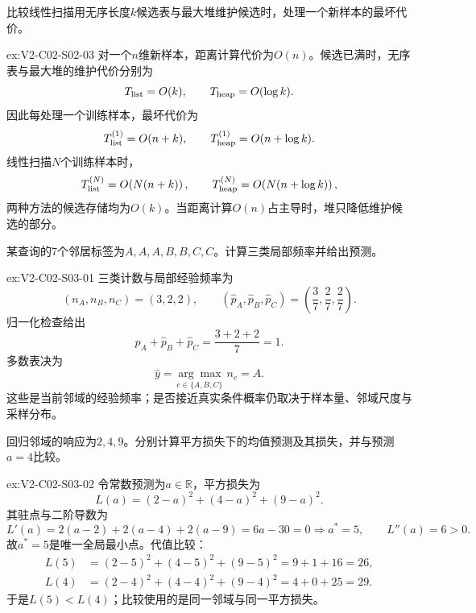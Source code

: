 \begin{SLChapterExercisePairSection}
\begin{exercise}\label{ex:V2-C02-S02-03}
比较线性扫描用无序长度$k$候选表与最大堆维护候选时，处理一个新样本的最坏代价。
\end{exercise}
\ifSLFullEdition
{}\label{sol:V2-C02-S02-03}
\begin{chapterexercisesolution}{ex:V2-C02-S02-03}
对一个$n$维新样本，距离计算代价为$O(n)$。候选已满时，无序表与最大堆的维护代价分别为
\[
T_{\rm list}=O(k),
\qquad
T_{\rm heap}=O(\log k).
\]
因此每处理一个训练样本，最坏代价为
\[
T_{\rm list}^{(1)}=O(n+k),
\qquad
T_{\rm heap}^{(1)}=O(n+\log k).
\]
线性扫描$N$个训练样本时，
\[
T_{\rm list}^{(N)}=O\!\left(N(n+k)\right),
\qquad
T_{\rm heap}^{(N)}=O\!\left(N(n+\log k)\right),
\]
两种方法的候选存储均为$O(k)$。当距离计算$O(n)$占主导时，堆只降低维护候选的部分。
\end{chapterexercisesolution}
\fi

\begin{exercise}\label{ex:V2-C02-S03-01}
某查询的7个邻居标签为$A,A,A,B,B,C,C$。计算三类局部频率并给出预测。
\end{exercise}
\ifSLFullEdition
{}\label{sol:V2-C02-S03-01}
\begin{chapterexercisesolution}{ex:V2-C02-S03-01}
三类计数与局部经验频率为
\[
(n_A,n_B,n_C)=(3,2,2),
\qquad
(\widehat p_A,\widehat p_B,\widehat p_C)
=\left(\frac37,\frac27,\frac27\right).
\]
归一化检查给出
\[
\widehat p_A+\widehat p_B+\widehat p_C
=\frac{3+2+2}{7}=1.
\]
多数表决为
\[
\widehat y
=\underset{c\in\{A,B,C\}}{\arg\max}\ n_c
=A.
\]
这些是当前邻域的经验频率；是否接近真实条件概率仍取决于样本量、邻域尺度与采样分布。
\end{chapterexercisesolution}
\fi

\begin{exercise}\label{ex:V2-C02-S03-02}
回归邻域的响应为$2,4,9$。分别计算平方损失下的均值预测及其损失，并与预测$a=4$比较。
\end{exercise}
\ifSLFullEdition
{}\label{sol:V2-C02-S03-02}
\begin{chapterexercisesolution}{ex:V2-C02-S03-02}
令常数预测为$a\in\mathbb R$，平方损失为
\[
L(a)=(2-a)^2+(4-a)^2+(9-a)^2.
\]
其驻点与二阶导数为
\[
L'(a)=2(a-2)+2(a-4)+2(a-9)=6a-30=0
\Longrightarrow a^*=5,
\qquad
L''(a)=6>0.
\]
故$a^*=5$是唯一全局最小点。代值比较：
\[
\begin{aligned}
L(5)&=(2-5)^2+(4-5)^2+(9-5)^2=9+1+16=26,\\
L(4)&=(2-4)^2+(4-4)^2+(9-4)^2=4+0+25=29.
\end{aligned}
\]
于是$L(5)<L(4)$；比较使用的是同一邻域与同一平方损失。
\end{chapterexercisesolution}
\fi


\end{SLChapterExercisePairSection}
